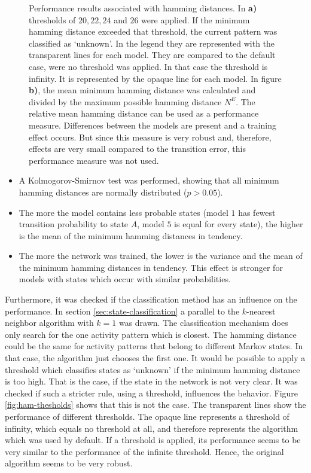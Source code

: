 \begin{figure}[!t]
    \caption[Performance results associated with hamming distances]{Performance results associated with hamming distances. In \textbf{a)} thresholds of $20,22,24$ and $26$ were applied. If the minimum hamming distance exceeded that threshold, the current pattern was classified as `unknown'. In the legend they are represented with the transparent lines for each model. They are compared to the default case, were no threshold was applied. In that case the threshold is infinity. It is represented by the opaque line for each model. In figure \textbf{b)}, the mean minimum hamming distance was calculated and divided by the maximum possible hamming distance $N^E$. The relative mean hamming distance can be used as a performance measure. Differences between the models are present and a training effect occurs. But since this measure is very robust and, therefore, effects are very small compared to the transition error, this performance measure was not used.}
    \label{fig:ham-thraining}
\end{figure}

\begin{itemize}
\item A Kolmogorov-Smirnov test was performed, showing that all minimum hamming distances are normally distributed ($p > 0.05$).
\item The more the model contains less probable states (model $1$ has fewest transition probability to state $A$, model $5$ is equal for every state), the higher is the mean of the minimum hamming distances in tendency.
\item The more the network was trained, the lower is the variance and the mean of the minimum hamming distances in tendency. This effect is stronger for models with states which occur with similar probabilities.
\end{itemize}

Furthermore, it was checked if the classification method has an influence on the performance. In section \ref{sec:state-classification} a parallel to the $k$-nearest neighbor algorithm with $k=1$ was drawn. The classification mechanism does only search for the one activity pattern which is closest. The hamming distance could be the same for activity patterns that belong to different Markov states. In that case, the algorithm just chooses the first one. It would be possible to apply a threshold which classifies states as `unknown' if the minimum hamming distance is too high. That is the case, if the state in the network is not very clear. It was checked if such a stricter rule, using a threshold, influences the behavior. Figure \ref{fig:ham-thesholds} shows that  this is not the case. The transparent lines show the performance of different thresholds. The opaque line represents a threshold of infinity, which equals no threshold at all, and therefore represents the algorithm which was used by default. If a threshold is applied, its performance seems to be very similar to the performance of the infinite threshold. Hence, the original algorithm seems to be very robust.

